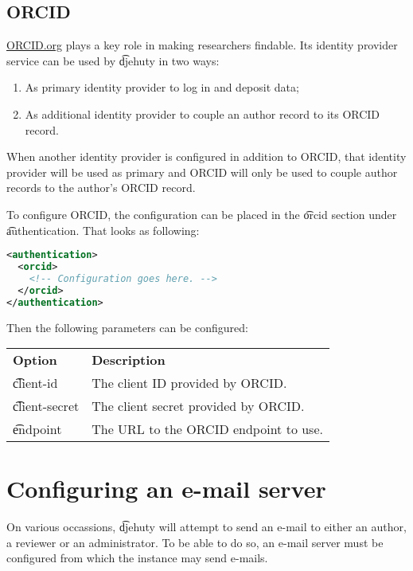 \subsection{ORCID}

  \href{https://orcid.org}{ORCID.org} plays a key role in making researchers
  findable.  Its identity provider service can be used by \t{djehuty} in two ways:
  \begin{enumerate}
  \item{As primary identity provider to log in and deposit data;}
  \item{As additional identity provider to couple an author record to its ORCID record.}
  \end{enumerate}

  When another identity provider is configured in addition to ORCID, that
  identity provider will be used as primary and ORCID will only be used to
  couple author records to the author's ORCID record.

  To configure ORCID, the configuration can be placed in the \t{orcid}
  section under \t{authentication}.  That looks as following:

\begin{lstlisting}[language=xml]
<authentication>
  <orcid>
    <!-- Configuration goes here. -->
  </orcid>
</authentication>
\end{lstlisting}

  Then the following parameters can be configured:

\begin{tabularx}{\textwidth}{*{1}{!{\VRule[-1pt]}l}!{\VRule[-1pt]}X}
  \headrow
  \textbf{Option}             & \textbf{Description}\\
  \t{client-id}               & The client ID provided by ORCID.\\
  \t{client-secret}           & The client secret provided by ORCID.\\
  \t{endpoint}                & The URL to the ORCID endpoint to use.
\end{tabularx}

\section{Configuring an e-mail server}

  On various occassions, \t{djehuty} will attempt to send an e-mail to either
  an author, a reviewer or an administrator.  To be able to do so, an e-mail
  server must be configured from which the instance may send e-mails.

